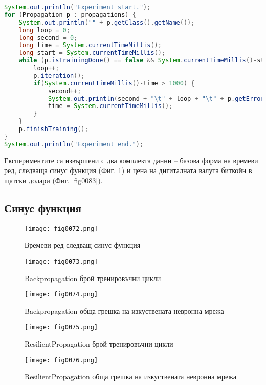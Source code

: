 \begin{lstlisting}[caption=Експериментална проверка на точните числени методи, language=Java, basicstyle=\tiny, label=list0022]
System.out.println("Experiment start.");
for (Propagation p : propagations) {
    System.out.println("" + p.getClass().getName());
    long loop = 0;
    long second = 0;
    long time = System.currentTimeMillis();
    long start = System.currentTimeMillis();
    while (p.isTrainingDone() == false && System.currentTimeMillis()-start < 1*60*1000) {
        loop++;
        p.iteration();
        if(System.currentTimeMillis()-time > 1000) {
            second++;
            System.out.println(second + "\t" + loop + "\t" + p.getError());
            time = System.currentTimeMillis();
        }
    }
    p.finishTraining();
}
System.out.println("Experiment end.");
\end{lstlisting}

Експериментите са извършени с два комплекта данни – базова форма на времеви ред, следваща синус функция (Фиг. \ref{fig0072}) и цена на дигиталната валута биткойн в щатски долари (Фиг. \ref{fig0083}). 

\subsection{Синус функция}

\begin{figure}[H]
  \centering
  \texttt{[image: fig0072.png]}
  \caption{Времеви ред следващ синус функция}
\label{fig0072}
\end{figure}

\begin{figure}[H]
  \centering
  \texttt{[image: fig0073.png]}
  \caption{Backpropagation брой тренировъчни цикли}
\label{fig0073}
\end{figure}

\begin{figure}[H]
  \centering
  \texttt{[image: fig0074.png]}
  \caption{Backpropagation обща грешка на изкуствената невронна мрежа}
\label{fig0074}
\end{figure}

\begin{figure}[H]
  \centering
  \texttt{[image: fig0075.png]}
  \caption{ResilientPropagation брой тренировъчни цикли}
\label{fig0075}
\end{figure}

\begin{figure}[H]
  \centering
  \texttt{[image: fig0076.png]}
  \caption{ResilientPropagation обща грешка на изкуствената невронна мрежа}
\label{fig0076}
\end{figure}

